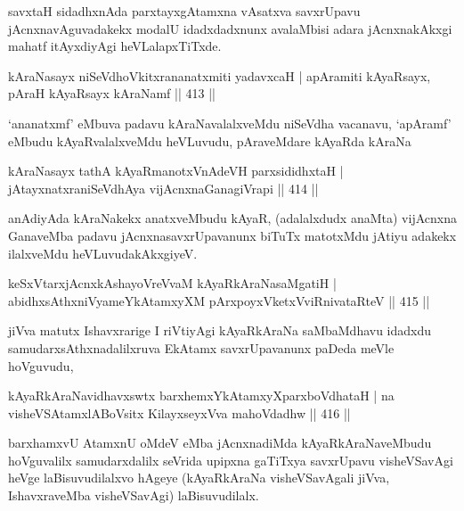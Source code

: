 \begin{artha}
savxtaH sidadhxnAda parxtayxgAtamxna vAsatxva savxrUpavu jAcnxnavAguvadakekx modalU idadxdadxnunx avalaMbisi adara jAcnxnakAkxgi mahatf itAyxdiyAgi heVLalapxTiTxde. 
\end{artha}


\begin{shl}
kAraNasayx niSeVdhoVkitxrananatxmiti yadavxcaH |
apAramiti kAyaRsayx, pAraH kAyaRsayx kAraNamf \hfill  || 413 ||
\end{shl}

\begin{artha}
`ananatxmf' eMbuva padavu kAraNavalalxveMdu niSeVdha vacanavu, `apAramf' eMbudu kAyaRvalalxveMdu heVLuvudu, pAraveMdare kAyaRda kAraNa
\end{artha}


\begin{shl}
kAraNasayx tathA kAyaRmanotxV\s nAdeVH parxsididhxtaH |
jAtayxnatxraniSeVdhAya vijAcnxnaGanagiVrapi \hfill  || 414 ||
\end{shl}

\begin{artha}
anAdiyAda kAraNakekx anatxveMbudu kAyaR, (adalalxdudx anaMta) vijAcnxna GanaveMba padavu jAcnxnasavxrUpavanunx biTuTx matotxMdu jAtiyu adakekx ilalxveMdu heVLuvudakAkxgiyeV.
\end{artha}

\begin{shl}
keSxVtarxjAcnxkAshayoVreVvaM kAyaRkAraNasaMgatiH |
abidhxsAthxniVyameYkAtamxyXM pArxpoyxVketxVviRnivataRteV \hfill  || 415 ||
\end{shl}

\begin{artha}
jiVva matutx Ishavxrarige I riVtiyAgi kAyaRkAraNa saMbaMdhavu idadxdu samudarxsAthxnadalilxruva EkAtamx savxrUpavanunx paDeda meVle hoVguvudu,
\end{artha}

\begin{shl}
kAyaRkAraNavidhavxswtx barxhemxYkAtamxyXparxboVdhataH |
na visheVSAtamxlABoV\s sitx KilayxseyxVva mahoVdadhw \hfill  || 416 ||
\end{shl}

\begin{artha}
barxhamxvU AtamxnU oMdeV eMba jAcnxnadiMda kAyaRkAraNaveMbudu hoVguvalilx samudarxdalilx seVrida upipxna gaTiTxya savxrUpavu visheVSavAgi heVge laBisuvudilalxvo hAgeye (kAyaRkAraNa visheVSavAgali jiVva, IshavxraveMba visheVSavAgi) laBisuvudilalx.
\end{artha}
